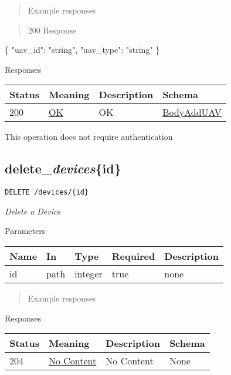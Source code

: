 \documentclass[
]{article}
\newenvironment{Shaded}{}{}
\newcommand{\DataTypeTok}[1]{\textcolor[rgb]{0.56,0.13,0.00}{#1}}
\newcommand{\FunctionTok}[1]{\textcolor[rgb]{0.02,0.16,0.49}{#1}}
\newcommand{\StringTok}[1]{\textcolor[rgb]{0.25,0.44,0.63}{#1}}
\begin{document}
\begin{quote}
Example responses
\end{quote}

\begin{quote}
200 Response
\end{quote}

\begin{Shaded}
\begin{Highlighting}[]
\FunctionTok{\{}
  \DataTypeTok{"uav\_id"}\FunctionTok{:} \StringTok{"string"}\FunctionTok{,}
  \DataTypeTok{"uav\_type"}\FunctionTok{:} \StringTok{"string"}
\FunctionTok{\}}
\end{Highlighting}
\end{Shaded}

Responses

\begin{longtable}[]{@{}llll@{}}
\toprule
Status & Meaning & Description & Schema\tabularnewline
\midrule
\endhead
200 & \href{https://tools.ietf.org/html/rfc7231\#section-6.3.1}{OK} & OK
& \protect\hyperlink{schemabodyadduav}{BodyAddUAV}\tabularnewline
\bottomrule
\end{longtable}

This operation does not require authentication

\hypertarget{delete_devicesid}{%
\subsection{\texorpdfstring{delete\_\emph{devices}\{id\}}{delete\_devices\{id\}}}\label{delete_devicesid}}

\texttt{DELETE\ /devices/\{id\}}

\emph{Delete a Device}

Parameters

\begin{longtable}[]{@{}lllll@{}}
\toprule
Name & In & Type & Required & Description\tabularnewline
\midrule
\endhead
id & path & integer & true & none\tabularnewline
\bottomrule
\end{longtable}

\begin{quote}
Example responses
\end{quote}

Responses

\begin{longtable}[]{@{}llll@{}}
\toprule
Status & Meaning & Description & Schema\tabularnewline
\midrule
\endhead
204 & \href{https://tools.ietf.org/html/rfc7231\#section-6.3.5}{No
Content} & No Content & None\tabularnewline
\bottomrule
\end{longtable}
\end{document}
